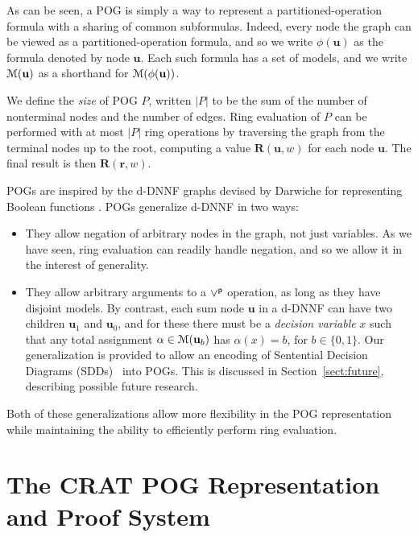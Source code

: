 \documentclass[letterpaper,USenglish,cleveref, autoref, thm-restate]{lipics-v2021}
\newcommand{\por}{\mathbin{\lor^{\sf p}}}
\newcommand{\rep}{\textbf{R}}
\newcommand{\assign}{\alpha}
\newcommand{\modelset}{{\cal M}}
\newcommand{\makenode}[1]{\mathbf{#1}}
\newcommand{\nodeu}{\makenode{u}}
\newcommand{\noder}{\makenode{r}}
\begin{document}
As can be seen, a POG is simply a way to represent a partitioned-operation
formula with a sharing of common subformulas.  Indeed, every node the graph can be viewed as a partitioned-operation formula, and so we write
$\phi(\nodeu)$ as the formula denoted by node $\nodeu$.
Each such formula has a set of models, and we write $\modelset(\nodeu)$ as a shorthand for $\modelset(\phi(\nodeu))$.

We define the {\em size} of POG $P$, written $|P|$ to be the sum of
the number of nonterminal nodes and the number of edges.  Ring
evaluation of $P$ can be performed with at most $|P|$ ring
operations by traversing the graph from the terminal nodes up to
the root, computing a value $\rep(\nodeu, w)$ for each node $\nodeu$.
The final result is then $\rep(\noder, w)$.

POGs are inspired by the d-DNNF graphs devised by Darwiche for
representing Boolean functions \cite{darwiche:jair:2002}.
POGs generalize d-DNNF in two ways:
\begin{itemize}
\item They allow negation of arbitrary nodes in the graph, not just
  variables.  As we have seen, ring evaluation can readily handle negation, and so we allow it in the interest of generality.

\item They allow arbitrary arguments to a $\por$ operation, as long as
  they have disjoint models.  By contrast, each
  sum node $\nodeu$ in a d-DNNF can have two children $\nodeu_1$ and $\nodeu_0$, and for these there must be a {\em decision variable} $x$ such that
  any total assignment $\assign \in  \modelset(\nodeu_b)$ has $\assign(x)=b$, for $b \in \{0,1\}$.
Our generalization is provided to allow an
  encoding of Sentential Decision Diagrams (SDDs)~\cite{darwiche:ijcai:2011} into
  POGs.  This is discussed in Section~\ref{sect:future}, describing possible future research.
\end{itemize}
  Both of these generalizations allow more flexibility in the POG
  representation while maintaining the ability to efficiently perform ring evaluation.


\section{The CRAT POG Representation and Proof System}
\end{document}
